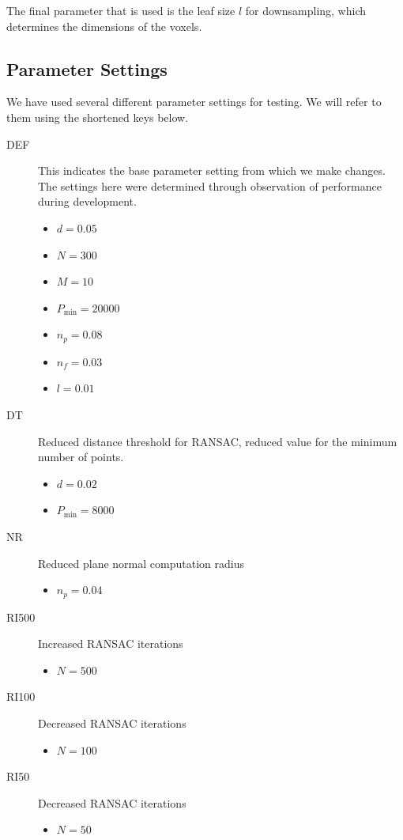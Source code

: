 \documentclass[11pt,a4paper]{kth-mag}
\begin{document}
The final parameter that is used is the leaf size $l$ for downsampling, which
determines the dimensions of the voxels.

\subsection{Parameter Settings}
We have used several different parameter settings for testing. We will refer to
them using the shortened keys below.

\begin{description}
\item[DEF] This indicates the base parameter setting from which we make changes.
  The settings here were determined through observation of performance during
  development.
  \begin{itemize}
  \item $d=0.05$
  \item $N=300$
  \item $M=10$
  \item $P_{\min}=20000$
  \item $n_p=0.08$
  \item $n_f=0.03$
  \item $l=0.01$
  \end{itemize}
\item[DT] Reduced distance threshold for RANSAC, reduced value for the
  minimum number of points.
  \begin{itemize}
  \item $d=0.02$
  \item $P_{\min}=8000$
  \end{itemize}
\item[NR] Reduced plane normal computation radius
  \begin{itemize}
  \item $n_p=0.04$
  \end{itemize}
\item[RI500] Increased RANSAC iterations
  \begin{itemize}
  \item $N=500$
  \end{itemize}
\item[RI100] Decreased RANSAC iterations
  \begin{itemize}
  \item $N=100$
  \end{itemize}
\item[RI50] Decreased RANSAC iterations
  \begin{itemize}
  \item $N=50$

\end{itemize}
\end{description}
\end{document}
